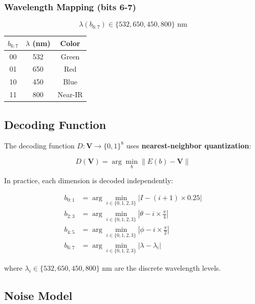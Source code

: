 \documentclass[11pt,a4paper]{article}
\begin{document}
\subsubsection{Wavelength Mapping (bits 6-7)}

\begin{equation}
    \lambda(b_{6:7}) \in \{532, 650, 450, 800\} \text{ nm}
\end{equation}

\begin{center}
\begin{tabular}{ccc}
\toprule
$b_{6:7}$ & $\lambda$ (nm) & Color \\
\midrule
00 & 532 & Green \\
01 & 650 & Red \\
10 & 450 & Blue \\
11 & 800 & Near-IR \\
\bottomrule
\end{tabular}
\end{center}

\subsection{Decoding Function}

The decoding function $D: \mathbf{V} \rightarrow \{0,1\}^8$ uses \textbf{nearest-neighbor quantization}:

\begin{equation}
    D(\mathbf{V}) = \arg\min_b \|E(b) - \mathbf{V}\|
\end{equation}

In practice, each dimension is decoded independently:

\begin{align}
    b_{0:1} &= \arg\min_{i \in \{0,1,2,3\}} |I - (i+1) \times 0.25| \\
    b_{2:3} &= \arg\min_{i \in \{0,1,2,3\}} |\theta - i \times \frac{\pi}{4}| \\
    b_{4:5} &= \arg\min_{i \in \{0,1,2,3\}} |\phi - i \times \frac{\pi}{2}| \\
    b_{6:7} &= \arg\min_{i \in \{0,1,2,3\}} |\lambda - \lambda_i|
\end{align}

where $\lambda_i \in \{532, 650, 450, 800\}$ nm are the discrete wavelength levels.

\subsection{Noise Model}
\end{document}
